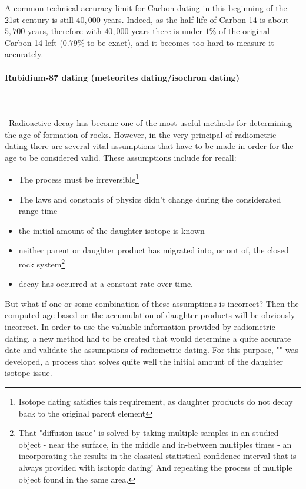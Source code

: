 	A common technical accuracy limit for Carbon dating in this beginning of the 21st century is still $40,000$ years. Indeed, as the half life of Carbon-14 is about $5,700$ years, therefore with $40,000$ years  there is under $1\%$ of the original Carbon-14 left ($0.79\%$ to be exact), and it becomes too hard to measure it accurately.
	
	\pagebreak
	\paragraph{Rubidium-87 dating (meteorites dating/isochron dating)}\mbox{}\\\\\
	Radioactive decay has become one of the most useful methods for determining the age of formation of rocks. However, in the very principal of radiometric dating there are several vital assumptions that have to be made in order for the age to be considered valid. These assumptions include for recall:
	\begin{itemize}
		\item The process must be irreversible\footnote{Isotope dating satisfies this requirement, as daughter products do not decay back to the original parent element}
	
		\item The laws and constants of physics didn't change during the considerated range time
		
		\item the initial amount of the daughter isotope is known
		
		\item neither parent or daughter product has migrated into, or out of, the closed rock system\footnote{That "diffusion issue" is solved by taking multiple samples in an studied object - near the surface, in the middle and in-between multiples times - an incorporating the results in the classical statistical confidence interval that is always provided with isotopic dating! And repeating the process of multiple object found in the same area.}
		
		\item decay has occurred at a constant rate over time.
	\end{itemize}
	But what if one or some combination of these assumptions is incorrect? Then the computed age based on the accumulation of daughter products will be obviously incorrect. In order to use the valuable information provided by radiometric dating, a new method had to be created that would determine a quite accurate date and validate the assumptions of radiometric dating. For this purpose, "" was developed, a process that solves quite well the initial amount of the daughter isotope issue.
	
